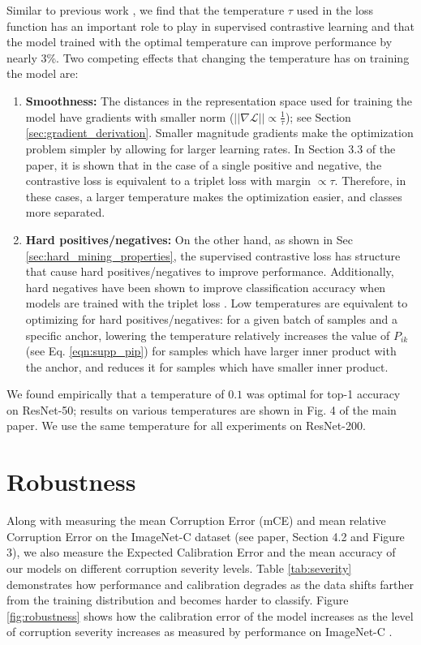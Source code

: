 Similar to previous work \cite{chen2020simple,tian2019contrastive}, we find that the temperature $\tau$ used in the loss function has an important role to play in supervised contrastive learning and that the model trained with the optimal temperature can improve performance by nearly 3\%. Two competing effects that changing the temperature has on training the model are:
\begin{enumerate}
    \item {\bf Smoothness:} The distances in the representation space used for training the model have gradients with smaller norm ($||\nabla \mathcal{L}|| \propto \frac{1}{\tau}$); see Section \ref{sec:gradient_derivation}. Smaller magnitude gradients make the optimization problem simpler by allowing for larger learning rates. In Section 3.3 of the paper, it is shown that in the case of a single positive and negative, the contrastive loss is equivalent to a triplet loss with margin $\propto\tau$. Therefore, in these cases, a larger temperature makes the optimization easier, and classes more separated.
    
    \item {\bf Hard positives/negatives:} On the other hand, as shown in Sec \ref{sec:hard_mining_properties}, the supervised contrastive loss has structure that cause hard positives/negatives to improve performance. Additionally, hard negatives have been shown to improve classification accuracy when models are trained with the triplet loss \cite{schroff2015facenet}. Low temperatures are equivalent to optimizing for hard positives/negatives: for a given batch of samples and a specific anchor, lowering the temperature relatively increases the value of $P_{ik}$ (see Eq. \ref{eqn:supp_pip}) for samples which have larger inner product with the anchor, and reduces it for samples which have smaller inner product.

\end{enumerate}

We found empirically that a temperature of $0.1$ was optimal for top-1 accuracy on ResNet-50; results on various temperatures are shown in Fig. 4 of the main paper. We use the same temperature for all experiments on ResNet-200. 





\section{Robustness}
Along with measuring the mean Corruption Error (mCE) and mean relative Corruption Error \cite{hendrycks2019benchmarking} on the ImageNet-C dataset (see paper, Section 4.2 and Figure 3), we also measure the Expected Calibration Error and the mean accuracy of our models on different corruption severity levels. Table \ref{tab:severity} demonstrates how performance and calibration degrades as the data shifts farther from the training distribution and becomes harder to classify. Figure \ref{fig:robustness} shows how the calibration error of the model increases as the level of corruption severity increases as measured by performance on ImageNet-C \cite{hendrycks2019benchmarking}.

